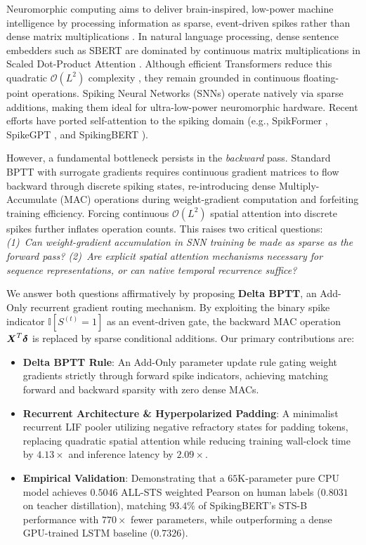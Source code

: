\documentclass[runningheads]{llncs}
\begin{document}
Neuromorphic computing aims to deliver brain-inspired, low-power machine intelligence by processing information as sparse, event-driven spikes rather than dense matrix multiplications \cite{roy2019towards}. In natural language processing, dense sentence embedders such as SBERT \cite{reimers2019sentence} are dominated by continuous matrix multiplications in Scaled Dot-Product Attention \cite{vaswani2017attention}. Although efficient Transformers reduce this quadratic $\mathcal{O}(L^2)$ complexity \cite{tay2022efficient}, they remain grounded in continuous floating-point operations. Spiking Neural Networks (SNNs) operate natively via sparse additions, making them ideal for ultra-low-power neuromorphic hardware. Recent efforts have ported self-attention to the spiking domain (e.g., SpikFormer \cite{zhou2023spikformer}, SpikeGPT \cite{zhu2023spikegpt}, and SpikingBERT \cite{bal2024spikingbert}).

However, a fundamental bottleneck persists in the \textit{backward} pass. Standard BPTT with surrogate gradients \cite{neftci2019surrogate} requires continuous gradient matrices to flow backward through discrete spiking states, re-introducing dense Multiply-Accumulate (MAC) operations during weight-gradient computation and forfeiting training efficiency. Forcing continuous $\mathcal{O}(L^2)$ spatial attention into discrete spikes further inflates operation counts. This raises two critical questions: \textit{(1)~Can weight-gradient accumulation in SNN training be made as sparse as the forward pass? (2)~Are explicit spatial attention mechanisms necessary for sequence representations, or can native temporal recurrence suffice?}

We answer both questions affirmatively by proposing \textbf{Delta BPTT}, an Add-Only recurrent gradient routing mechanism. By exploiting the binary spike indicator $\mathbb{I}[S^{(t)} = 1]$ as an event-driven gate, the backward MAC operation $\boldsymbol{X}^T \boldsymbol{\delta}$ is replaced by sparse conditional additions. Our primary contributions are:
\begin{itemize}
    \item \textbf{Delta BPTT Rule}: An Add-Only parameter update rule gating weight gradients strictly through forward spike indicators, achieving matching forward and backward sparsity with zero dense MACs.
    \item \textbf{Recurrent Architecture \& Hyperpolarized Padding}: A minimalist recurrent LIF pooler utilizing negative refractory states for padding tokens, replacing quadratic spatial attention while reducing training wall-clock time by $4.13\times$ and inference latency by $2.09\times$.
    \item \textbf{Empirical Validation}: Demonstrating that a $65$K-parameter pure CPU model achieves $0.5046$ ALL-STS weighted Pearson on human labels ($0.8031$ on teacher distillation), matching $93.4\%$ of SpikingBERT's STS-B performance with $770\times$ fewer parameters, while outperforming a dense GPU-trained LSTM baseline ($0.7326$).
\end{itemize}
\end{document}
